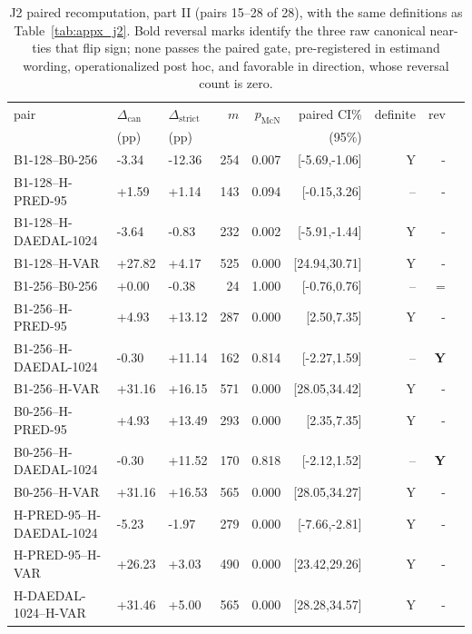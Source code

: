 \documentclass{article}
\begin{document}
\begin{table}[H]
\centering\footnotesize
\setlength{\tabcolsep}{2pt}
\begin{tabular}{lllrrrrrr}
\toprule
pair & $\Delta_{\mathrm{can}}$ & $\Delta_{\mathrm{strict}}$ & $m$ & $p_{\mathrm{McN}}$ & paired CI\% & definite & rev \\
     & (pp) & (pp) & & & (95\%) & & \\
\midrule
B1-128--B0-256 & -3.34 & -12.36 & 254 & 0.007 & [-5.69,-1.06] & Y & - \\
B1-128--H-PRED-95 & +1.59 & +1.14 & 143 & 0.094 & [-0.15,3.26] & -- & - \\
B1-128--H-DAEDAL-1024 & -3.64 & -0.83 & 232 & 0.002 & [-5.91,-1.44] & Y & - \\
B1-128--H-VAR & +27.82 & +4.17 & 525 & 0.000 & [24.94,30.71] & Y & - \\
B1-256--B0-256 & +0.00 & -0.38 & 24 & 1.000 & [-0.76,0.76] & -- & = \\
B1-256--H-PRED-95 & +4.93 & +13.12 & 287 & 0.000 & [2.50,7.35] & Y & - \\
B1-256--H-DAEDAL-1024 & -0.30 & +11.14 & 162 & 0.814 & [-2.27,1.59] & -- & \textbf{Y} \\
B1-256--H-VAR & +31.16 & +16.15 & 571 & 0.000 & [28.05,34.42] & Y & - \\
B0-256--H-PRED-95 & +4.93 & +13.49 & 293 & 0.000 & [2.35,7.35] & Y & - \\
B0-256--H-DAEDAL-1024 & -0.30 & +11.52 & 170 & 0.818 & [-2.12,1.52] & -- & \textbf{Y} \\
B0-256--H-VAR & +31.16 & +16.53 & 565 & 0.000 & [28.05,34.27] & Y & - \\
H-PRED-95--H-DAEDAL-1024 & -5.23 & -1.97 & 279 & 0.000 & [-7.66,-2.81] & Y & - \\
H-PRED-95--H-VAR & +26.23 & +3.03 & 490 & 0.000 & [23.42,29.26] & Y & - \\
H-DAEDAL-1024--H-VAR & +31.46 & +5.00 & 565 & 0.000 & [28.28,34.57] & Y & - \\
\bottomrule
\end{tabular}
\caption{J2 paired recomputation, part II (pairs 15--28 of 28), with the same
definitions as Table~\ref{tab:appx_j2}.  Bold reversal marks identify the three
raw canonical near-ties that flip sign; none passes the paired gate,
pre-registered in estimand wording, operationalized post hoc, and favorable in
direction, whose
reversal count is zero.}
\label{tab:appx_j2b}
\end{table}
\end{document}

